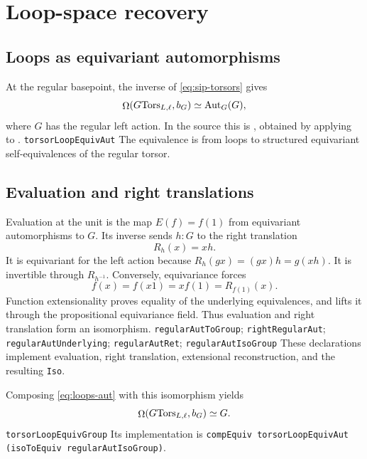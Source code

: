 \section{Loop-space recovery}
\label{sec:loops}

\subsection{Loops as equivariant automorphisms}
At the regular basepoint, the inverse of \eqref{eq:sip-torsors} gives
\begin{equation}
 \mathop{\Omega}(G\mathrm{Tors}_{L,\ell},b_G)\simeq\operatorname{Aut}_G(G),
 \label{eq:loops-aut}
\end{equation}
where $G$ has the regular left action.  In the source this is
, obtained by applying  to
.
{\texttt{torsorLoopEquivAut}}
{The equivalence is from loops to structured equivariant self-equivalences of the regular torsor.}

\subsection{Evaluation and right translations}
Evaluation at the unit is the map $E(f)=f(1)$ from equivariant automorphisms
to $G$.  Its inverse sends $h:G$ to the right translation
\begin{equation}
 R_h(x)=xh.
 \label{eq:right-translation}
\end{equation}
It is equivariant for the left action because $R_h(gx)=(gx)h=g(xh)$.  It is
invertible through $R_{h^{-1}}$.  Conversely, equivariance forces
\begin{equation}
 f(x)=f(x1)=xf(1)=R_{f(1)}(x).
 \label{eq:equivariant-determined}
\end{equation}
Function extensionality proves equality of the underlying equivalences, and
 lifts it through the propositional equivariance field.  Thus
evaluation and right translation form an isomorphism.
{\texttt{regularAutToGroup}; \texttt{rightRegularAut}; \texttt{regularAutUnderlying}; \texttt{regularAutRet}; \texttt{regularAutIsoGroup}}
{These declarations implement evaluation, right translation, extensional reconstruction, and the resulting \texttt{Iso}.}

Composing \eqref{eq:loops-aut} with this isomorphism yields
\begin{equation}
 \mathop{\Omega}(G\mathrm{Tors}_{L,\ell},b_G)\simeq G.
 \label{eq:generic-loop}
\end{equation}
{\texttt{torsorLoopEquivGroup}}
{Its implementation is \texttt{compEquiv torsorLoopEquivAut (isoToEquiv regularAutIsoGroup)}.}

